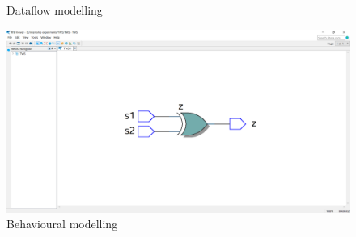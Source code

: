 \documentclass[12pt]{article}
\begin{document}
\begin{enumerate}
\begin{figure}[H]
    \caption{Dataflow modelling}
\end{figure}
\begin{figure}[H]
    \centering
    \includegraphics[scale=0.35]{TWSRTL2.png}
    \caption{Behavioural modelling}
\end{figure}
\end{enumerate}
\end{document}
